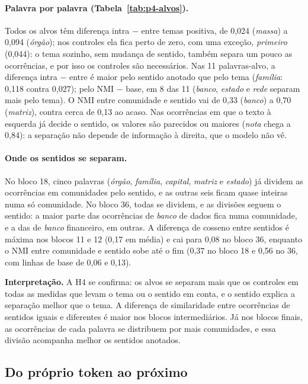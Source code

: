 \paragraph{Palavra por palavra (Tabela~\ref{tab:p4-alvos}).} Todos os alvos têm diferença
intra $-$ entre temas positiva, de 0,024 (\emph{massa}) a 0,094 (\emph{órgão}); nos controles
ela fica perto de zero, com uma exceção, \emph{primeiro} (0,044): o tema sozinho, sem mudança de
sentido, também separa um pouco as ocorrências, e por isso os controles são necessários. Nas 11
palavras-alvo, a diferença intra $-$ entre é maior pelo sentido anotado que pelo tema
(\emph{família}: 0,118 contra 0,027); pelo NMI $-$ base, em 8 das 11 (\emph{banco},
\emph{estado} e \emph{rede} separam mais pelo tema). O NMI entre comunidade e sentido
vai de 0,33 (\emph{banco}) a 0,70 (\emph{matriz}), contra cerca de 0,13 ao acaso. Nas ocorrências em que o texto à esquerda
já decide o sentido, os valores são parecidos ou maiores (\emph{nota} chega a 0,84): a
separação não depende de informação à direita, que o modelo não vê.

\paragraph{Onde os sentidos se separam.} No bloco 18, cinco palavras (\emph{órgão},
\emph{família}, \emph{capital}, \emph{matriz} e \emph{estado}) já dividem as ocorrências em
comunidades pelo sentido, e as outras seis ficam quase inteiras numa só comunidade. No bloco
36, todas se dividem, e as divisões seguem o sentido: a maior parte das ocorrências de
\emph{banco} de dados fica numa comunidade, e a das de \emph{banco} financeiro, em outras. A
diferença de cosseno entre sentidos é máxima nos blocos 11 e 12 (0,17 em média) e cai para
0,08 no bloco 36, enquanto o NMI entre comunidade e sentido sobe até o fim (0,37 no bloco 18 e
0,56 no 36, com linhas de base de 0,06 e 0,13).

\textbf{Interpretação.} A H4 se confirma: os alvos se separam mais que os controles em todas as
medidas que levam o tema ou o sentido em conta, e o sentido explica a separação melhor que o
tema. A diferença de similaridade entre ocorrências de sentidos iguais e diferentes é maior nos
blocos intermediários. Já nos blocos finais, as ocorrências de cada palavra se distribuem por
mais comunidades, e essa divisão acompanha melhor os sentidos anotados.

\subsection{Do próprio token ao próximo}\label{sec:res-lente}

